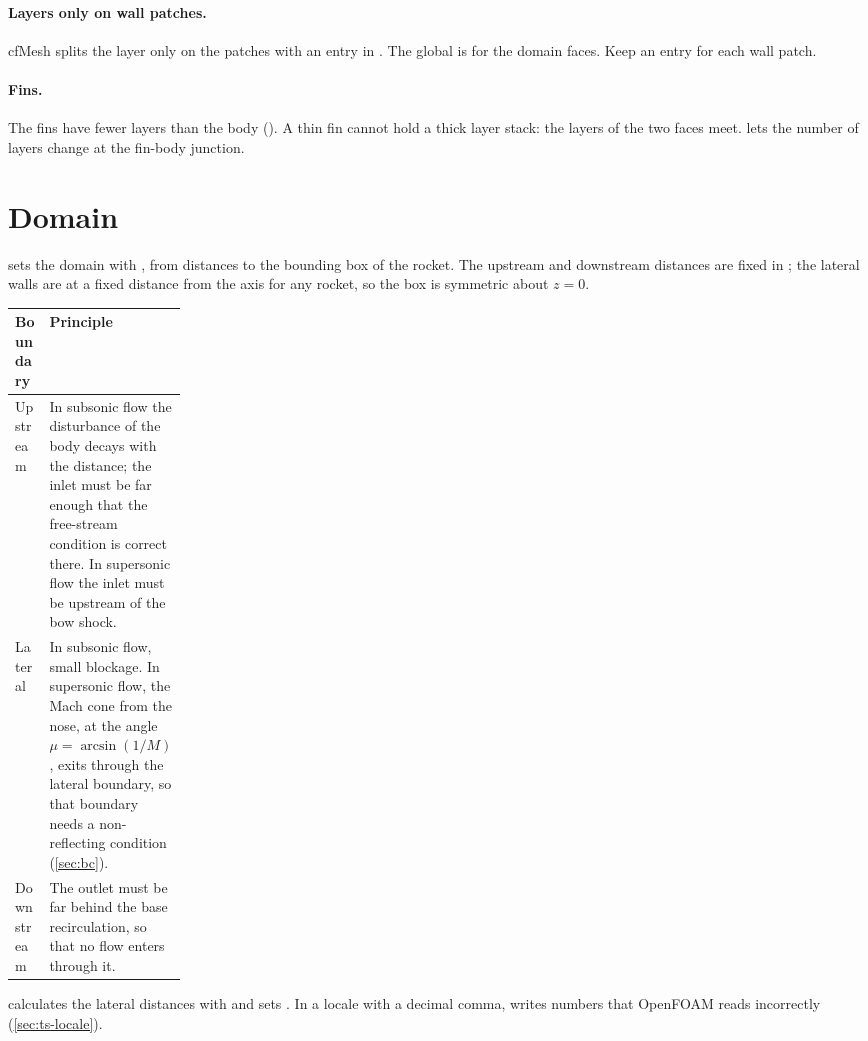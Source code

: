 \paragraph{Layers only on wall patches.} cfMesh splits the layer only on the patches
with an entry in . The global  is for the domain
faces. Keep an entry for each wall patch.

\paragraph{Fins.} The fins have fewer layers than the body
(). A thin fin cannot hold a thick layer stack: the
layers of the two faces meet.  lets the number of layers change
at the fin-body junction.

\section{Domain}\label{sec:domain}

 sets the domain with , from distances to
the bounding box of the rocket. The upstream and downstream distances are fixed in
; the lateral walls are at a fixed distance from the axis for any rocket,
so the box is symmetric about $z = 0$.

\begin{tabularx}{\linewidth}{@{}P{0.20\linewidth} L@{}}
\toprule
Boundary & Principle \\
\midrule
Upstream & In subsonic flow the disturbance of the body decays with the distance; the inlet must be far enough that the free-stream condition is correct there. In supersonic flow the inlet must be upstream of the bow shock. \\
Lateral & In subsonic flow, small blockage. In supersonic flow, the Mach cone from the nose, at the angle $\mu = \arcsin(1/M)$, exits through the lateral boundary, so that boundary needs a non-reflecting condition (\cref{sec:bc}). \\
Downstream & The outlet must be far behind the base recirculation, so that no flow enters through it. \\
\bottomrule
\end{tabularx}

\begin{caution}
 calculates the lateral distances with  and sets
. In a locale with a decimal comma,  writes numbers that
OpenFOAM reads incorrectly (\cref{sec:ts-locale}).
\end{caution}

